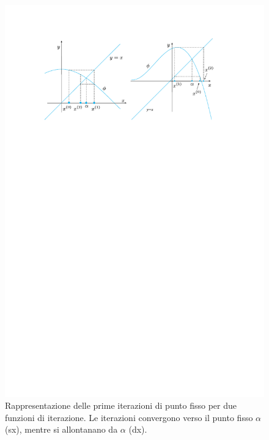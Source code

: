 \begin{figure}[!htp]
    \centering
    \includegraphics[width=\textwidth]{img/iterazioni-di-punto-fisso-2.pdf}
    \caption{Rappresentazione delle prime iterazioni di punto fisso per due funzioni di iterazione. Le iterazioni convergono verso il punto fisso $\alpha$ (sx), mentre si allontanano da $\alpha$ (dx).}
    \label{fig: interpretazione geometrica di un punto fisso}
\end{figure}

\newpage

